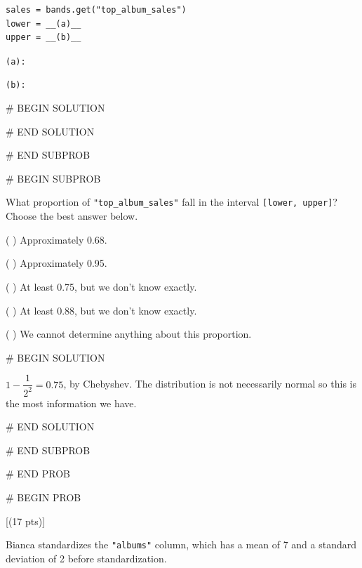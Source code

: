 \documentclass[twoside,12pt]{article}
\begin{document}
{\begin{verbatim}
sales = bands.get("top_album_sales")
lower = __(a)__
upper = __(b)__
\end{verbatim}

\texttt{(a):} 

\smallskip
\texttt{(b):} 

# BEGIN SOLUTION





# END SOLUTION



# END SUBPROB

\bigskip

# BEGIN SUBPROB


What proportion of \texttt{"top\_album\_sales"} fall in the interval \texttt{[lower, upper]}? Choose the best answer below.

\medskip

( ) Approximately 0.68.

\smallskip

( ) Approximately 0.95.

\smallskip

( ) At least 0.75, but we don't know exactly.

\smallskip

( ) At least 0.88, but we don't know exactly.

\smallskip

( ) We cannot determine anything about this proportion.

# BEGIN SOLUTION


$1 - \dfrac{1}{2^2} = 0.75$, by Chebyshev. The distribution is not necessarily normal so this is the most information we have.


# END SOLUTION



# END SUBPROB





# END PROB

\newpage

# BEGIN PROB

[(17 pts)]

Bianca standardizes the \texttt{"albums"} column, which has a mean of 7 and a standard deviation of 2 before standardization. 





}
\end{document}
